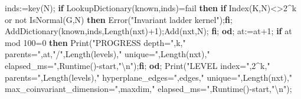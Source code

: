 \documentclass[
  10pt,
  letterpaper,
]{article}
\newenvironment{Shaded}{}{}
\newcommand{\BuiltInTok}[1]{\textcolor[rgb]{0.00,0.50,0.00}{#1}}
\newcommand{\ConstantTok}[1]{\textcolor[rgb]{0.53,0.00,0.00}{#1}}
\newcommand{\ControlFlowTok}[1]{\textcolor[rgb]{0.00,0.44,0.13}{\textbf{#1}}}
\newcommand{\FloatTok}[1]{\textcolor[rgb]{0.25,0.63,0.44}{#1}}
\newcommand{\NormalTok}[1]{#1}
\newcommand{\OperatorTok}[1]{\textcolor[rgb]{0.40,0.40,0.40}{#1}}
\newcommand{\OtherTok}[1]{\textcolor[rgb]{0.00,0.44,0.13}{#1}}
\newcommand{\StringTok}[1]{\textcolor[rgb]{0.25,0.44,0.63}{#1}}
\newcommand{\VariableTok}[1]{\textcolor[rgb]{0.10,0.09,0.49}{#1}}
\begin{document}
\begin{Shaded}
\begin{Highlighting}[]
    \VariableTok{inds}\OperatorTok{:=}\VariableTok{key}\NormalTok{(}\VariableTok{N}\NormalTok{)}\OperatorTok{;}
    \ControlFlowTok{if} \BuiltInTok{LookupDictionary}\NormalTok{(}\VariableTok{known}\OperatorTok{,}\VariableTok{inds}\NormalTok{)}\OperatorTok{=}\ConstantTok{fail} \ControlFlowTok{then}
     \ControlFlowTok{if} \BuiltInTok{Index}\NormalTok{(}\VariableTok{K}\OperatorTok{,}\VariableTok{N}\NormalTok{)}\OperatorTok{\textless{}\textgreater{}}\FloatTok{2}\OperatorTok{\^{}}\VariableTok{k} \ConstantTok{or} \ConstantTok{not} \BuiltInTok{IsNormal}\NormalTok{(}\VariableTok{G}\OperatorTok{,}\VariableTok{N}\NormalTok{) }\ControlFlowTok{then} \BuiltInTok{Error}\NormalTok{(}\StringTok{"Invariant ladder kernel"}\NormalTok{)}\OperatorTok{;}\ControlFlowTok{fi}\OperatorTok{;}
     \BuiltInTok{AddDictionary}\NormalTok{(}\VariableTok{known}\OperatorTok{,}\VariableTok{inds}\OperatorTok{,}\BuiltInTok{Length}\NormalTok{(}\VariableTok{nxt}\NormalTok{)}\OperatorTok{+}\FloatTok{1}\NormalTok{)}\OperatorTok{;}\BuiltInTok{Add}\NormalTok{(}\VariableTok{nxt}\OperatorTok{,}\VariableTok{N}\NormalTok{)}\OperatorTok{;}
    \ControlFlowTok{fi}\OperatorTok{;}
   \ControlFlowTok{od}\OperatorTok{;}
   \VariableTok{at}\OperatorTok{:=}\VariableTok{at}\OperatorTok{+}\FloatTok{1}\OperatorTok{;}
   \ControlFlowTok{if} \VariableTok{at} \OtherTok{mod} \FloatTok{100}\OperatorTok{=}\FloatTok{0} \ControlFlowTok{then} \BuiltInTok{Print}\NormalTok{(}\StringTok{"PROGRESS depth="}\OperatorTok{,}\VariableTok{k}\OperatorTok{,}\StringTok{" parents="}\OperatorTok{,}\VariableTok{at}\OperatorTok{,}\StringTok{"/"}\OperatorTok{,}\BuiltInTok{Length}\NormalTok{(}\VariableTok{levels}\NormalTok{)}\OperatorTok{,}\StringTok{" unique="}\OperatorTok{,}\BuiltInTok{Length}\NormalTok{(}\VariableTok{nxt}\NormalTok{)}\OperatorTok{,}\StringTok{" elapsed\_ms="}\OperatorTok{,}\BuiltInTok{Runtime}\NormalTok{()}\OperatorTok{{-}}\VariableTok{start}\OperatorTok{,}\StringTok{"\textbackslash{}n"}\NormalTok{)}\OperatorTok{;}\ControlFlowTok{fi}\OperatorTok{;}
  \ControlFlowTok{od}\OperatorTok{;}
  \BuiltInTok{Print}\NormalTok{(}\StringTok{"LEVEL index="}\OperatorTok{,}\FloatTok{2}\OperatorTok{\^{}}\VariableTok{k}\OperatorTok{,}\StringTok{" parents="}\OperatorTok{,}\BuiltInTok{Length}\NormalTok{(}\VariableTok{levels}\NormalTok{)}\OperatorTok{,}\StringTok{" hyperplane\_edges="}\OperatorTok{,}\VariableTok{edges}\OperatorTok{,}\StringTok{" unique="}\OperatorTok{,}\BuiltInTok{Length}\NormalTok{(}\VariableTok{nxt}\NormalTok{)}\OperatorTok{,}\StringTok{" max\_coinvariant\_dimension="}\OperatorTok{,}\VariableTok{maxdim}\OperatorTok{,}\StringTok{" elapsed\_ms="}\OperatorTok{,}\BuiltInTok{Runtime}\NormalTok{()}\OperatorTok{{-}}\VariableTok{start}\OperatorTok{,}\StringTok{"\textbackslash{}n"}\NormalTok{)}\OperatorTok{;}

\end{Highlighting}
\end{Shaded}
\end{document}
